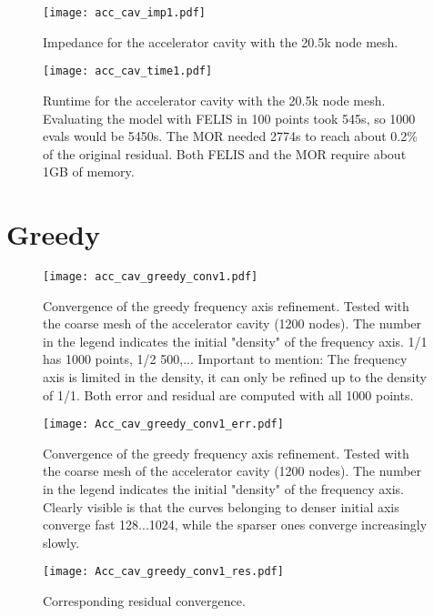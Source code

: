 \begin{figure}[h]
	\centering
	\texttt{[image: acc\_cav\_imp1.pdf]}
	\caption{Impedance for the accelerator cavity with the 20.5k node mesh.}
	\label{ }
\end{figure}

\begin{figure}[h]
	\centering
	\texttt{[image: acc\_cav\_time1.pdf]}
	\caption{Runtime for the accelerator cavity with the 20.5k node mesh. Evaluating the model with FELIS in 100 points took 545s, so 1000 evals would be 5450s. The MOR needed 2774s to reach about 0.2\% of the original residual. Both FELIS and the MOR require about 1GB of memory.}
	\label{ }
\end{figure}




\section{Greedy}

\begin{figure}[h]
	\centering
	\texttt{[image: acc\_cav\_greedy\_conv1.pdf]}
	\caption{Convergence of the greedy frequency axis refinement. Tested with the coarse mesh of the accelerator cavity (1200 nodes). The number in the legend indicates the initial "density" of the frequency axis. 1/1 has 1000 points, 1/2 500,... Important to mention: The frequency axis is limited in the density, it can only be refined up to the density of 1/1. Both error and residual are computed with all 1000 points.}
	\label{ }
\end{figure}

\begin{figure}[h]
	\centering
	\texttt{[image: Acc\_cav\_greedy\_conv1\_err.pdf]}
	\caption{Convergence of the greedy frequency axis refinement. Tested with the coarse mesh of the accelerator cavity (1200 nodes). The number in the legend indicates the initial "density" of the frequency axis. Clearly visible is that the curves belonging to denser initial axis converge fast 128...1024, while the sparser ones converge increasingly slowly.}
	\label{ }
\end{figure}

\begin{figure}[h]
	\centering
	\texttt{[image: Acc\_cav\_greedy\_conv1\_res.pdf]}
	\caption{Corresponding residual convergence.}
	\label{ }
\end{figure}






























